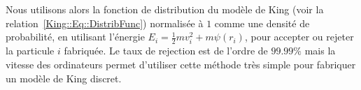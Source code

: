 


			Nous utilisons alors la fonction de distribution du modèle de King (voir la
			relation~\ref{King::Eq::DistribFunc}) normalisée à $1$ comme une densité de probabilité, en
			utilisant l'énergie $E_i = \frac{1}{2}mv_i^2 + m\psi(r_i)$, pour accepter ou rejeter la
			particule $i$ fabriquée. Le taux de rejection est de l'ordre de $99.99\%$
			mais la vitesse des ordinateurs permet d'utiliser cette méthode très simple pour fabriquer un
			modèle de King discret.


